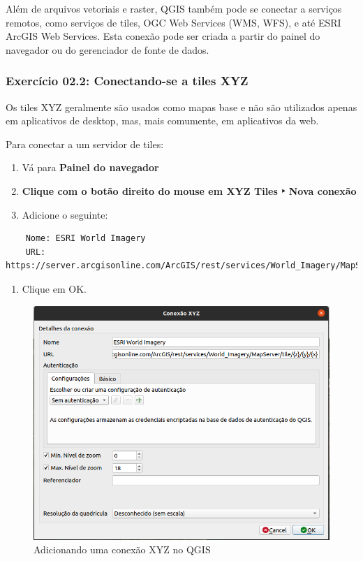 \documentclass[
]{book}
\providecommand{\tightlist}{%
  \setlength{\itemsep}{0pt}\setlength{\parskip}{0pt}}
\begin{document}
Além de arquivos vetoriais e raster, QGIS também pode se conectar a serviços remotos, como serviços de tiles, OGC Web Services (WMS, WFS), e até ESRI ArcGIS Web Services. Esta conexão pode ser criada a partir do painel do navegador ou do gerenciador de fonte de dados.

\hypertarget{exercuxedcio-02.2-conectando-se-a-tiles-xyz}{%
\subsubsection{\texorpdfstring{\textbf{Exercício 02.2: Conectando-se a tiles XYZ}}{Exercício 02.2: Conectando-se a tiles XYZ}}\label{exercuxedcio-02.2-conectando-se-a-tiles-xyz}}

Os tiles XYZ geralmente são usados como mapas base e não são utilizados apenas em aplicativos de desktop, mas, mais comumente, em aplicativos da web.

Para conectar a um servidor de tiles:

\begin{enumerate}
\def\labelenumi{\arabic{enumi}.}
\tightlist
\item
  Vá para \textbf{Painel do navegador}
\item
  \textbf{Clique com o botão direito do mouse em XYZ Tiles ‣ Nova conexão}
\item
  Adicione o seguinte:
\end{enumerate}

\begin{verbatim}
    Nome: ESRI World Imagery
    URL: https://server.arcgisonline.com/ArcGIS/rest/services/World_Imagery/MapServer/tile/{z}/{y}/{x}
\end{verbatim}

\begin{enumerate}
\def\labelenumi{\arabic{enumi}.}
\setcounter{enumi}{3}
\tightlist
\item
  Clique em OK.
\end{enumerate}

\begin{figure}
\centering
\includegraphics{media/modulo2/xyz-1.png}
\caption{Adicionando uma conexão XYZ no QGIS}
\end{figure}
\end{document}
